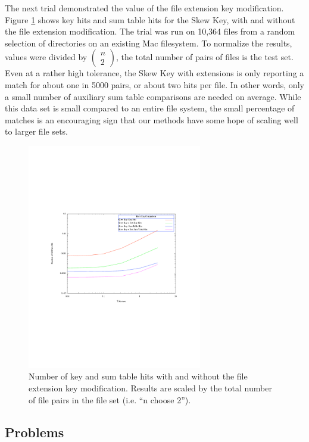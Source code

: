 \documentclass[10pt, twocolumn]{article}
\begin{document}
The next trial demonstrated the value of the file extension key modification.  Figure \ref{PairwiseSavings} shows key hits and sum table hits for the Skew Key, with and without the file extension modification.  The trial was run on 10,364 files from a random selection of directories on an existing Mac filesystem.  To normalize the results, values were divided by $\left( \begin{array}{c} n \\ 2 \end{array} \right)$, the total number of pairs of files is the test set.  Even at a rather high tolerance, the Skew Key with extensions is only reporting a match for about one in 5000 pairs, or about two hits per file. In other words, only a small number of auxiliary sum table comparisons are needed on average.  While this data set is small compared to an entire file system, the small percentage of matches is an encouraging sign that our methods have some hope of scaling well to larger file sets.

 \begin{figure}[t] 
 \centering
\includegraphics[width= 3in]{PairwiseElim.pdf}
\caption{Number of key and sum table hits with and without the file extension key modification.  Results are scaled by the total number of file pairs in the file set (i.e. ``n choose 2'').  }
\label{PairwiseSavings} 
\end{figure}


\subsection{Problems}
\end{document}
